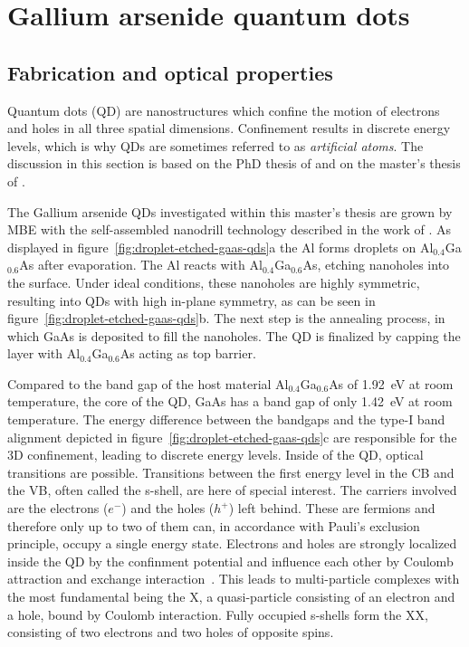 \chapter{Gallium arsenide quantum dots}
\label{chapter:quantum-dot}

\section{Fabrication and optical properties}

Quantum dots (\acs{QD}) are nanostructures which confine the motion of electrons and holes in all three spatial dimensions.
Confinement results in discrete energy levels, which is why \acp{QD} are sometimes referred to as \textit{artificial atoms}.
The discussion in this section is based on the PhD thesis of \textcite{huber_gaas_2019} and on the master's thesis of \textcite{schimpf_towards_2017}.

The Gallium arsenide \acp{QD} investigated within this master's thesis are grown by \ac{MBE} with the self-assembled nanodrill technology described in the work of \textcite{wang_nanoholes_2007}.
As displayed in figure~\ref{fig:droplet-etched-gaas-qds}a the Al forms droplets on Al$_{0.4}$Ga$_{0.6}$As after evaporation.
The Al reacts with Al$_{0.4}$Ga$_{0.6}$As, etching nanoholes into the surface.
Under ideal conditions, these nanoholes are highly symmetric, resulting into \acp{QD} with high in-plane symmetry, as can be seen in figure~\ref{fig:droplet-etched-gaas-qds}b.
The next step is the annealing process, in which GaAs is deposited to fill the nanoholes.
The \ac{QD} is finalized by capping the layer with Al$_{0.4}$Ga$_{0.6}$As acting as top barrier.

Compared to the band gap of the host material Al$_{0.4}$Ga$_{0.6}$As of \SI{1.92}{\electronvolt} at room temperature, the core of the \ac{QD}, GaAs has a band gap of only \SI{1.42}{\electronvolt} at room temperature.
The energy difference between the bandgaps and the type-I band alignment depicted in figure~\ref{fig:droplet-etched-gaas-qds}c are responsible for the 3D confinement, leading to discrete energy levels.
Inside of the \ac{QD}, optical transitions are possible.
Transitions between the first energy level in the \ac{CB} and the \ac{VB}, often called the s-shell, are here of special interest.
The carriers involved are the electrons ($e^-$) and the holes ($h^+$) left behind.
These are fermions and therefore only up to two of them can, in accordance with Pauli's exclusion principle, occupy a single energy state.
Electrons and holes are strongly localized inside the \ac{QD} by the confinment potential and influence each other by Coulomb attraction and exchange interaction~\cite{bimberg_quantum_1999}.
This leads to multi-particle complexes with the most fundamental being the \acf{X}, a quasi-particle consisting of an electron and a hole, bound by Coulomb interaction.
Fully occupied s-shells form the \acf{XX}, consisting of two electrons and two holes of opposite spins.

